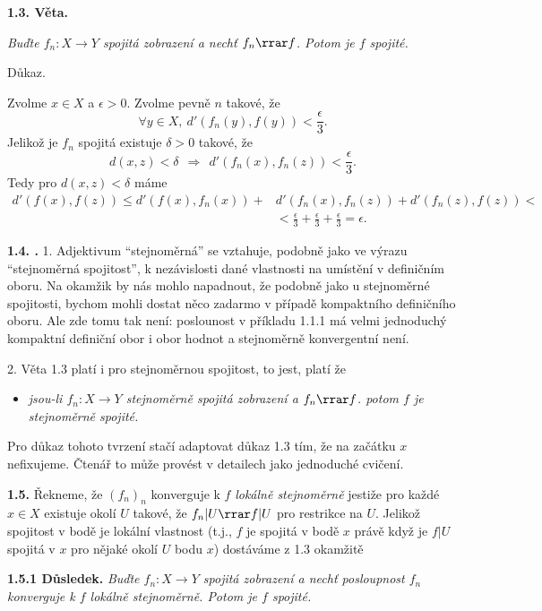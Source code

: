 \documentclass[12pt]{article}
\begin{document}
 \bigskip
 
 {\bf 1.3. Věta.} {\em Buďte $f_n:X\to Y$ spojitá zobrazení a nechť   $f_n\rrar f$.
 Potom je $f$ spojité.
 
 Důkaz.} Zvolme $x\in X$ a $\epsilon >0$. Zvolme pevně $n$ takové, že
 $$
 \forall y\in X, \ d'(f_n(y),f(y))<\frac{\epsilon}{3}.
 $$
 Jelikož je $f_n$ spojitá existuje $\delta>0$ takové, že
 $$
 d(x,z)<\delta\ \ \Rightarrow\ \ d'(f_n(x),f_n(z))<\frac{\epsilon}{3}.
 $$
 Tedy pro $d(x,z)<\delta$ máme
 $$
\begin{aligned}
 d'(f(x),f(z))\leq d'(f(x),f_n(x))+&d'(f_n(x),f_n(z))+d'(f_n(z),f(z))<\\
 &<\frac{\epsilon}{3}+\frac{\epsilon}{3}+\frac{\epsilon}{3}=\epsilon.
\end{aligned}
 $$
 \sq
 
 \bigskip
 
 {\bf 1.4. .} 1.
 Adjektivum ``stejnoměrná'' se vztahuje, podobně jako ve výrazu ``stejnoměrná spojitost'', k nezávislosti dané vlastnosti na umístění v definičním oboru. Na okamžik by nás mohlo napadnout, že podobně jako u stejnoměrné spojitosti, bychom mohli dostat něco zadarmo v případě kompaktního definičního oboru. Ale zde tomu tak není:
poslounost v příkladu  1.1.1 má velmi jednoduchý kompaktní definiční obor i obor hodnot a stejnoměrně konvergentní není.
 
 2. Věta 1.3 platí i pro stejnoměrnou spojitost, to jest, platí že
 \begin{itemize}
 \item[] 
 {\em jsou-li $f_n:X\to Y$ stejnoměrně spojitá zobrazení a  $f_n\rrar f$.
 potom $f$ je stejnoměrně spojité.}
 \end{itemize}
  Pro důkaz tohoto tvrzení stačí adaptovat důkaz  1.3 tím, že na začátku  $x$ nefixujeme. Čtenář to může provést v detailech jako jednoduché cvičení.
  
  \bigskip
  
  {\bf 1.5.} Řekneme, že  $(f_n)_n$ konverguje k $f$ {\em lokálně stejnoměrně} jestiže pro každé $x\in X$ existuje okolí $U$ takové, že $f_n|U\rrar f|U$ pro restrikce na  $U$. Jelikož spojitost v bodě je lokální vlastnost (t.j., $f$ je spojitá v bodě $x$ právě když je $f|U$ spojitá v $x$ pro nějaké okolí  $U$ bodu $x$) dostáváme z 1.3 okamžitě
  
  \medskip
  
  {\bf 1.5.1 Důsledek.} {\em Buďte $f_n:X\to Y$ spojitá zobrazení a nechť posloupnost $f_n$ konverguje k $f$ lokálně stejnoměrně.
 Potom je $f$ spojité.}
 
\end{document}
